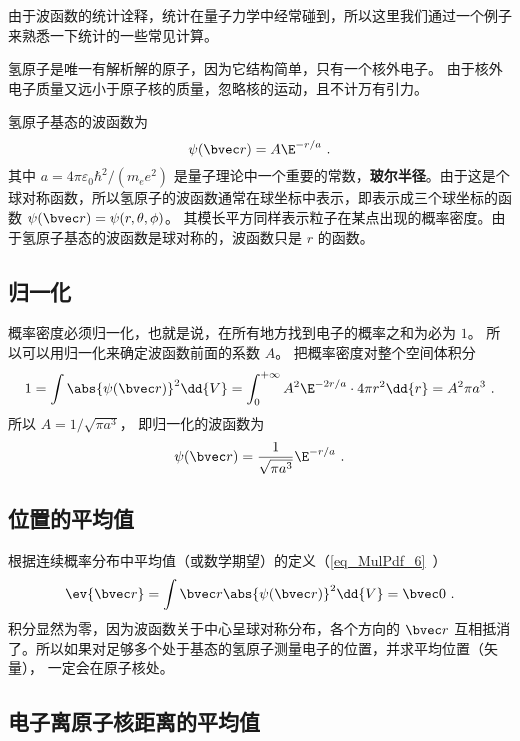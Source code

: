 

由于波函数的统计诠释，统计在量子力学中经常碰到，所以这里我们通过一个例子来熟悉一下统计的一些常见计算。

氢原子是唯一有解析解的原子，因为它结构简单，只有一个核外电子。 由于核外电子质量又远小于原子核的质量，忽略核的运动，且不计万有引力。

氢原子基态的波函数为
\begin{equation}
\psi(\bvec r) = A\E^{-r/a}~.
\end{equation}
其中 $a = 4\pi\varepsilon_0 \hbar ^2/(m_e e^2)$ 是量子理论中一个重要的常数，\textbf{玻尔半径}。由于这是个球对称函数，所以氢原子的波函数通常在球坐标中表示，即表示成三个球坐标的函数 $\psi (\bvec r) = \psi (r, \theta, \phi)$。 其模长平方同样表示粒子在某点出现的概率密度。由于氢原子基态的波函数是球对称的，波函数只是 $r$ 的函数。

\subsection{归一化}
  
概率密度必须归一化，也就是说，在所有地方找到电子的概率之和为必为 $1$。 所以可以用归一化来确定波函数前面的系数 $A$。 把概率密度对整个空间体积分
\begin{equation}
1 = \int \abs{\psi(\bvec r)} ^2 \dd{V}  = \int_0^{+\infty} A^2 \E^{-2r/a} \cdot 4\pi r^2\dd{r} = A^2 \pi a^3~.
\end{equation}
所以 $A = 1/\sqrt{\pi a^3}$， 即归一化的波函数为
\begin{equation}
\psi (\bvec r) = \frac{1}{\sqrt{\pi a^3}} \E^{-r/a}~.
\end{equation}

\subsection{位置的平均值}

 根据连续概率分布中平均值（或数学期望）的定义（\autoref{eq_MulPdf_6}~）
\begin{equation}
\ev{\bvec r} = \int \bvec r \abs{\psi (\bvec r)} ^2 \dd{V} =  \bvec 0~.
\end{equation}
积分显然为零，因为波函数关于中心呈球对称分布，各个方向的 $\bvec r$ 互相抵消了。所以如果对足够多个处于基态的氢原子测量电子的位置，并求平均位置（矢量）， 一定会在原子核处。

\subsection{电子离原子核距离的平均值}

